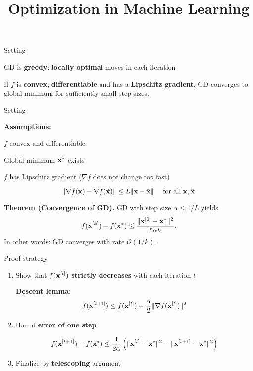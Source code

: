 \documentclass[11pt,compress,t,notes=noshow, xcolor=table]{beamer}
\title{Optimization in Machine Learning}
\begin{document}

\begin{framei}[sep=L]{Setting}
\item GD is \textbf{greedy}: \textbf{locally optimal} moves in each iteration
\item If $f$ is \textbf{convex}, \textbf{differentiable} and has a \textbf{Lipschitz gradient}, GD converges to global minimum for sufficiently small step sizes.
\vfill
{}
\end{framei}

\begin{framei}{Setting}
\item\textbf{Assumptions:}
\begin{itemizeM}
\item $f$ convex and differentiable
\item Global minimum $\mathbf{x}^\ast$ exists
\item $f$ has Lipschitz gradient ($\nabla f$ does not change too fast)
\begin{framed}
$$\| \nabla f(\mathbf{x}) - \nabla f(\tilde{\mathbf{x}}) \| \le L \|\mathbf{x} - \tilde{\mathbf{x}}\| \quad \text{ for all $\mathbf{x}, \tilde{\mathbf{x}}$}$$
\end{framed}
\end{itemizeM}
\begin{framed}
\textbf{Theorem \textnormal{(Convergence of GD)}.}
GD with step size $\alpha \leq 1/L$ yields
$$f(\mathbf{x}^{[k]}) - f(\mathbf{x}^\ast) \leq \frac{\| \mathbf{x}^{[0]} - \mathbf{x}^\ast \|^2}{2\alpha k}.$$
In other words: GD converges with rate $\mathcal{O}(1/k)$.
\end{framed}
\end{framei}

\begin{frame2}{Proof strategy}
\begin{enumerate}
\item Show that $f(\mathbf{x}^{[t]})$ \textbf{strictly decreases} with each iteration $t$
\begin{framed}
\textbf{Descent lemma:}
$$f(\mathbf{x}^{[t+1]}) \le f(\mathbf{x}^{[t]}) - \frac{\alpha}{2} \|\nabla f(\mathbf{x}^{[t]})\|^2$$
\end{framed}
\item Bound \textbf{error of one step}
\begin{framed}
$$f(\mathbf{x}^{[t+1]}) - f(\mathbf{x}^\ast) \leq \frac{1}{2 \alpha} \left( \|\mathbf{x}^{[t]}-\mathbf{x}^\ast\|^2 - \| \mathbf{x}^{[t+1]} - \mathbf{x}^\ast \|^2 \right)$$
\end{framed}
\item Finalize by \textbf{telescoping} argument
\end{enumerate}
\end{frame2}
\end{document}
